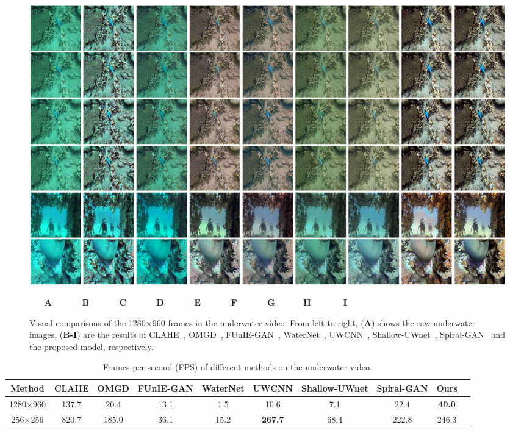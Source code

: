 \documentclass[utf8]{FrontiersinHarvard} %
\begin{document}
\begin{figure}[htbp]
\begin{center}
\includegraphics[width=1\textwidth]{FSpiralGAN_frontiers/onepicture/underwater_video300.jpg}
\end{center}
$~~~~~~~~$\textbf{A}$~~~~~~~~~~~~~~~~$\textbf{B}$~~~~~~~~~~~~~~~~$\textbf{C}$~~~~~~~~~~~~~~~~$\textbf{D}$~~~~~~~~~~~~~~~~$\textbf{E}$~~~~~~~~~~~~~~~~$\textbf{F}$~~~~~~~~~~~~~~~~$\textbf{G}$~~~~~~~~~~~~~~~$\textbf{H}$~~~~~~~~~~~~~~~~~$\textbf{I}
 \caption{Visual comparisons of the 1280$\times$960 frames in the underwater video. From left to right, (\textbf{A}) shows the raw underwater images, (\textbf{B-I}) are the results of CLAHE~\citep{109340}, OMGD~\citep{ren2021online}, FUnIE-GAN~\citep{9001231}, WaterNet~\citep{8917818}, UWCNN~\citep{2019Underwater1}, Shallow-UWnet~\citep{naik2021shallow}, Spiral-GAN~\citep{2020Underwater} and the proposed model, respectively.\label{fig:comparison-underwater video}}
\end{figure}

\begin{table}[htbp]\normalsize
\centering
\setlength\tabcolsep{2.7pt}
\caption{Frames per second (FPS) of different methods on the underwater video.}
\begin{tabular}{c|ccccccccc}
\hline  
Method&CLAHE&OMGD&FUnIE-GAN&WaterNet&UWCNN&Shallow-UWnet&Spiral-GAN&Ours\\
\hline 
1280$\times$960&137.7&20.4&13.1&1.5&10.6&7.1&22.4&\textbf{40.0}\\
\hline
256$\times$256&820.7&185.0&36.1&15.2&\textbf{267.7}&68.4&222.8&246.3\\
\hline 
\end{tabular}
\label{tbl:comparison-underwatervideo1}
\end{table}
\end{document}
